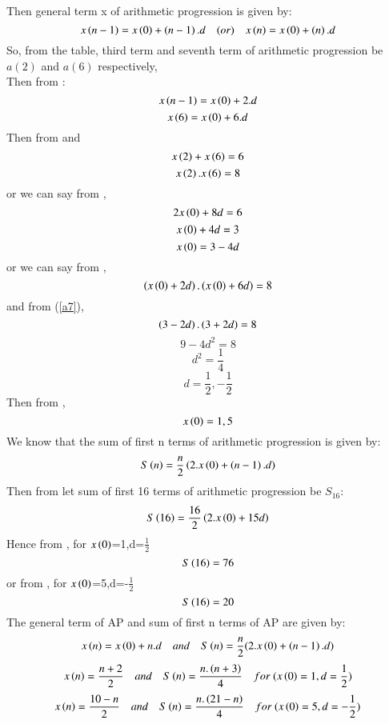\documentclass[beamer]{IEEEtran}
\theoremstyle{remark}
\begin{document}
Then general term x of arithmetic progression is given by:
\begin{equation}
\label{a2}
x\left(n-1\right)=x\left(0\right)+\left(n-1\right).d\quad (or)\quad x\left(n\right)=x\left(0\right)+\left(n\right).d
\end{equation}
So, from the table, third term and seventh term of arithmetic progression be $a(2)$ and $a(6)$ respectively,\\
Then from \brak{\ref{a2}}:
\begin{equation}
\label{a3}
x\left(n-1\right) = x\left(0\right)+2.d
\end{equation}
\begin{equation}
\label{a4}
x\left(6\right)=x\left(0\right)+6.d
\end{equation} 
Then from \brak{\ref{a3}} and \brak{\ref{a4}}
\begin{equation}
\label{a5}
x\left(2\right)+x\left(6\right)=6
\end{equation}
\begin{equation}
\label{a6}
x\left(2\right).x\left(6\right)=8
\end{equation}
or we can say from \brak{\ref{a5}},
\[2x\left(0\right)+8d=6\]
\[x\left(0\right)+4d=3\]
\begin{equation}
\label{a7}
x\left(0\right)=3-4d
\end{equation}
or we can say from \brak{\ref{a6}},
$$\left(x\left(0\right)+2d\right).\left(x\left(0\right)+6d\right)=8$$
and from (\ref{a7}),
\[\left(3-2d\right).\left(3+2d\right)=8\]
\[9-4d^2=8\]
\[d^2=\frac{1}{4}\]
\begin{equation}
\label{a8}
d=\frac{1}{2},-\frac{1}{2}
\end{equation}
Then from \brak{\ref{a7}},
\begin{equation}
\label{a9}
x\left(0\right)=1,5
\end{equation}
We know that the sum of first n terms of arithmetic progression is given by:
\begin{equation}
\label{a10}
S\left(n\right)= \frac{n}{2}\left(2.x\left(0\right)+\left(n-1\right).d\right)
\end{equation}
Then from \brak{\ref{a10}} let sum of first 16 terms of arithmetic progression be $S_{16}$:
\begin{equation}
\label{general9}
S\left(16\right)= \frac{16}{2}\left(2.x\left(0\right)+15d\right)
\end{equation}
Hence from \brak{\ref{general9}},
for $x\left(0\right)$=1,d=$\frac{1}{2}$
$$S\left(16\right)=76$$
or from \brak{\ref{general9}},
for $x\left(0\right)$=5,d=-$\frac{1}{2}$
$$S\left(16\right)=20$$
The general term of AP  and sum of first n terms of AP  are given by:
$$x\left(n\right)=x\left(0\right)+n.d\quad and\quad S\left(n\right)=\frac{n}{2}(2.x\left(0\right)+\left(n-1\right).d)$$
$$x\brak{n}=\frac{n+2}{2}\quad and\quad S\brak{n}=\frac{n.\brak{n+3}}{4}\quad for\ (x\brak{0}=1,d=\frac{1}{2})$$
$$x\brak{n}=\frac{10-n}{2}\quad and\quad S\brak{n}=\frac{n.\brak{21-n}}{4}\quad for\ (x\brak{0}=5,d=-\frac{1}{2})$$
\end{document}
